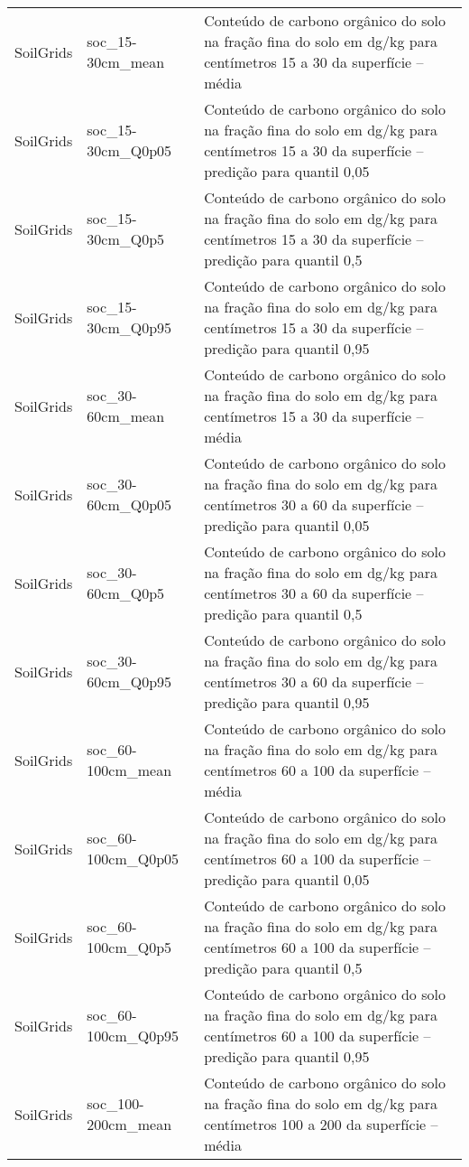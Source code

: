 \begin{longtable}{@{} p{4cm} p{4cm} p{8cm} @{}}
	SoilGrids &
	soc\_15-30cm\_mean &
	Conteúdo de carbono orgânico do solo na fração fina do solo em dg/kg para centímetros 15 a 30 da superfície – média \\
	SoilGrids &
	soc\_15-30cm\_Q0p05 &
	Conteúdo de carbono orgânico do solo na fração fina do solo em dg/kg para centímetros 15 a 30 da superfície – predição para quantil 0,05 \\
	SoilGrids &
	soc\_15-30cm\_Q0p5 &
	Conteúdo de carbono orgânico do solo na fração fina do solo em dg/kg para centímetros 15 a 30 da superfície – predição para quantil 0,5 \\
	SoilGrids &
	soc\_15-30cm\_Q0p95 &
	Conteúdo de carbono orgânico do solo na fração fina do solo em dg/kg para centímetros 15 a 30 da superfície – predição para quantil 0,95 \\
	SoilGrids &
	soc\_30-60cm\_mean &
	Conteúdo de carbono orgânico do solo na fração fina do solo em dg/kg para centímetros 15 a 30 da superfície – média \\
	SoilGrids &
	soc\_30-60cm\_Q0p05 &
	Conteúdo de carbono orgânico do solo na fração fina do solo em dg/kg para centímetros 30 a 60 da superfície – predição para quantil 0,05 \\
	SoilGrids &
	soc\_30-60cm\_Q0p5 &
	Conteúdo de carbono orgânico do solo na fração fina do solo em dg/kg para centímetros 30 a 60 da superfície – predição para quantil 0,5 \\
	SoilGrids &
	soc\_30-60cm\_Q0p95 &
	Conteúdo de carbono orgânico do solo na fração fina do solo em dg/kg para centímetros 30 a 60 da superfície – predição para quantil 0,95 \\
	SoilGrids &
	soc\_60-100cm\_mean &
	Conteúdo de carbono orgânico do solo na fração fina do solo em dg/kg para centímetros 60 a 100 da superfície – média \\
	SoilGrids &
	soc\_60-100cm\_Q0p05 &
	Conteúdo de carbono orgânico do solo na fração fina do solo em dg/kg para centímetros 60 a 100 da superfície – predição para quantil 0,05 \\
	SoilGrids &
	soc\_60-100cm\_Q0p5 &
	Conteúdo de carbono orgânico do solo na fração fina do solo em dg/kg para centímetros 60 a 100 da superfície – predição para quantil 0,5 \\
	SoilGrids &
	soc\_60-100cm\_Q0p95 &
	Conteúdo de carbono orgânico do solo na fração fina do solo em dg/kg para centímetros 60 a 100 da superfície – predição para quantil 0,95 \\
	SoilGrids &
	soc\_100-200cm\_mean &
	Conteúdo de carbono orgânico do solo na fração fina do solo em dg/kg para centímetros 100 a 200 da superfície – média \\

\end{longtable}

